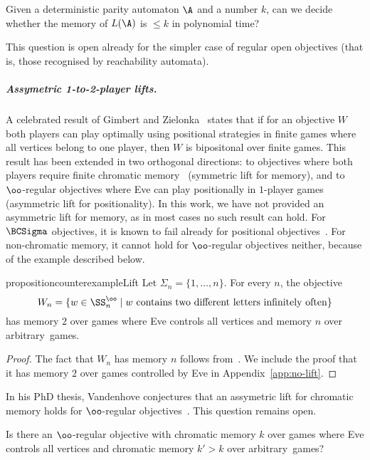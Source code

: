 \begin{question}\label{quest:ptime}
	Given a deterministic parity automaton $\A$ and a number $k$, can we decide whether the memory of $L(\A)$ is $\leq k$ in polynomial time?
\end{question}

This question is open already for the simpler case of regular open objectives (that is, those recognised by reachability automata).


\subparagraph{Assymetric 1-to-2-player lifts.} A celebrated result of Gimbert and Zielonka~\cite{GZ05} states that if for an objective $W$ both players can play optimally using positional strategies in finite games where all vertices belong to one player, then $W$ is bipositonal over finite games. This result has been extended in two orthogonal directions: to objectives where both players require finite chromatic memory~\cite{BRORV22,BRV23} (symmetric lift for memory), and to $\oo$-regular objectives where Eve can play positionally in $1$-player games~\cite{CO24Positional} (asymmetric lift for positionality).
In this work, we have not provided an asymmetric lift for memory, as in most cases no such result can hold.
For  $\BCSigma$ objectives, it is known to fail already for positional objectives~\cite[Section~7]{GK22Submixing}.
For non-chromatic memory, it cannot hold for $\oo$-regular objectives neither, because of the example described below.

\begin{restatable}{proposition}{counterexampleLift}
\label{prop:1-2-player-counterexample}
	Let $\Sigma_n = \{1,\dots, n\}$. For every $n$, the objective 
	\[W_n = \{w\in \SS_n^\oo \mid w \text{ contains two different letters infinitely often}\} \] 
	 has memory $2$ over games where Eve controls all vertices and memory $n$ over arbitrary~games.
\end{restatable}
\begin{proof}
	The fact that $W_n$ has memory $n$ follows from~\cite{DJW1997memory}. We include the proof that it has memory $2$ over games controlled by Eve in Appendix~\ref{app:no-lift}.
\end{proof}
In his PhD thesis, Vandenhove conjectures that an assymetric lift for chromatic memory holds for $\oo$-regular objectives~\cite[Conjecture~9.1.2]{Vandenhove23Thesis}. This question remains open.

\begin{question}
	Is there an $\oo$-regular objective  with chromatic memory $k$ over games where Eve controls all vertices and chromatic memory $k'>k$ over arbitrary~games?
\end{question}


